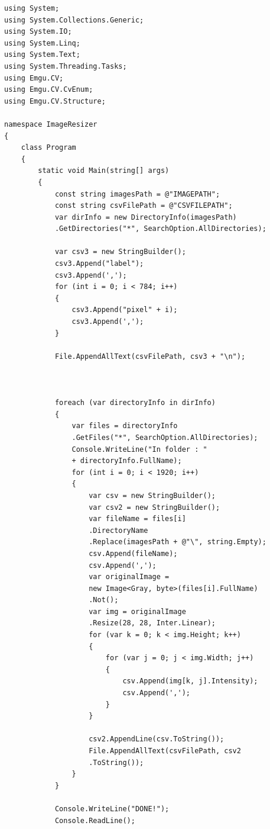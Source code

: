 \documentclass[brudnopis]{xmgr}
\begin{document}
\begin{lstlisting}
using System;
using System.Collections.Generic;
using System.IO;
using System.Linq;
using System.Text;
using System.Threading.Tasks;
using Emgu.CV;
using Emgu.CV.CvEnum;
using Emgu.CV.Structure;

namespace ImageResizer
{
    class Program
    {
        static void Main(string[] args)
        {
            const string imagesPath = @"IMAGEPATH";
            const string csvFilePath = @"CSVFILEPATH";
            var dirInfo = new DirectoryInfo(imagesPath)
            .GetDirectories("*", SearchOption.AllDirectories);

            var csv3 = new StringBuilder();
            csv3.Append("label");
            csv3.Append(',');
            for (int i = 0; i < 784; i++)
            {
                csv3.Append("pixel" + i);
                csv3.Append(',');
            }

            File.AppendAllText(csvFilePath, csv3 + "\n");



            foreach (var directoryInfo in dirInfo)
            {
                var files = directoryInfo
                .GetFiles("*", SearchOption.AllDirectories);
                Console.WriteLine("In folder : " 
                + directoryInfo.FullName);
                for (int i = 0; i < 1920; i++)
                {
                    var csv = new StringBuilder();
                    var csv2 = new StringBuilder();
                    var fileName = files[i]
                    .DirectoryName
                    .Replace(imagesPath + @"\", string.Empty);
                    csv.Append(fileName);
                    csv.Append(',');
                    var originalImage = 
                    new Image<Gray, byte>(files[i].FullName)
                    .Not();
                    var img = originalImage
                    .Resize(28, 28, Inter.Linear);
                    for (var k = 0; k < img.Height; k++)
                    {
                        for (var j = 0; j < img.Width; j++)
                        {
                            csv.Append(img[k, j].Intensity);
                            csv.Append(',');
                        }
                    }

                    csv2.AppendLine(csv.ToString());
                    File.AppendAllText(csvFilePath, csv2
                    .ToString());
                }
            }

            Console.WriteLine("DONE!");
            Console.ReadLine();


\end{lstlisting}
\end{document}
